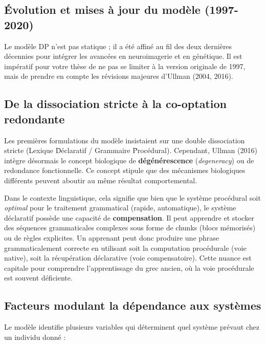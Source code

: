 \subsection{Évolution et mises à jour du modèle (1997-2020)}

Le modèle DP n'est pas statique ; il a été affiné au fil des deux dernières décennies pour intégrer
les avancées en neuroimagerie et en génétique. Il est impératif pour votre thèse de ne pas se
limiter à la version originale de 1997, mais de prendre en compte les révisions majeures d'Ullman
(2004, 2016).



\subsection{De la dissociation stricte à la co-optation redondante}

Les premières formulations du modèle insistaient sur une double dissociation stricte (Lexique \=
Déclaratif / Grammaire \= Procédural). Cependant, Ullman (2016) intègre désormais le concept
biologique de \textbf{dégénérescence} (\textit{degeneracy}) ou de redondance fonctionnelle. Ce
concept stipule que des mécanismes biologiques différents peuvent aboutir au même résultat
comportemental.

Dans le contexte linguistique, cela signifie que bien que le système procédural soit
\textit{optimal} pour le traitement grammatical (rapide, automatique), le système déclaratif possède
une capacité de \textbf{compensation}. Il peut apprendre et stocker des séquences grammaticales
complexes sous forme de \og chunks\fg{} (blocs mémorisés) ou de règles explicites. Un apprenant peut
donc produire une phrase grammaticalement correcte en utilisant soit la computation procédurale
(voie native), soit la récupération déclarative (voie compensatoire). Cette nuance est capitale pour
comprendre l'apprentissage du grec ancien, où la voie procédurale est souvent déficiente.



\subsection{Facteurs modulant la dépendance aux systèmes}

Le modèle identifie plusieurs variables qui déterminent quel système prévaut chez un individu donné
:

